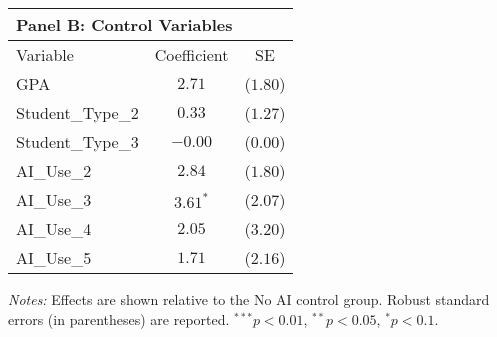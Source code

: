 \begin{table}[!htbp]
\begin{tabular}{lcc}
\multicolumn{3}{l}{\textbf{Panel B: Control Variables}} \\
\hline\hline
Variable & Coefficient & SE \\
\hline
GPA & $2.71$ & ($1.80$) \\
Student_Type_2 & $0.33$ & ($1.27$) \\
Student_Type_3 & $-0.00$ & ($0.00$) \\
AI_Use_2 & $2.84$ & ($1.80$) \\
AI_Use_3 & $3.61^{*}$ & ($2.07$) \\
AI_Use_4 & $2.05$ & ($3.20$) \\
AI_Use_5 & $1.71$ & ($2.16$) \\
\hline
\end{tabular}
\begin{tablenotes}
\small
\item \textit{Notes:} Effects are shown relative to the No AI control group. Robust standard errors (in parentheses) are reported. $^{***}p<0.01$, $^{**}p<0.05$, $^{*}p<0.1$.
\end{tablenotes}
\end{table}